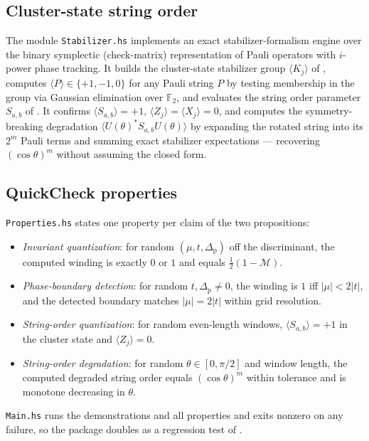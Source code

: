 \documentclass[12pt]{article}
\newcommand{\Maj}{\mathcal{M}}                   %
\theoremstyle{definition}
\theoremstyle{remark}
\begin{document}
\subsection{Cluster-state string order}

The module \texttt{Stabilizer.hs} implements an exact stabilizer-formalism engine over the
binary symplectic (check-matrix) representation of Pauli operators with $i$-power phase
tracking. It builds the cluster-state stabilizer group $\langle K_j\rangle$ of
, computes $\langle P\rangle\in\{+1,-1,0\}$ for any Pauli string $P$ by
testing membership in the group via Gaussian elimination over $\mathbb{F}_2$, and evaluates
the string order parameter $S_{a,b}$ of . It confirms $\langle
S_{a,b}\rangle=+1$, $\langle Z_j\rangle=\langle X_j\rangle=0$, and computes the
symmetry-breaking degradation $\langle U(\theta)^\ast S_{a,b}U(\theta)\rangle$ by expanding
the rotated string into its $2^m$ Pauli terms and summing exact stabilizer expectations ---
recovering $(\cos\theta)^m$ without assuming the closed form.

\subsection{QuickCheck properties}

\texttt{Properties.hs} states one property per claim of the two propositions:
\begin{itemize}
  \item \emph{Invariant quantization}: for random $(\mu,t,\Delta_{\mathrm{p}})$ off the discriminant, the
        computed winding is exactly $0$ or $1$ and equals $\tfrac12(1-\Maj)$.
  \item \emph{Phase-boundary detection}: for random $t,\Delta_{\mathrm{p}}\ne0$, the winding is $1$ iff
        $|\mu|<2|t|$, and the detected boundary matches $|\mu|=2|t|$ within grid resolution.
  \item \emph{String-order quantization}: for random even-length windows, $\langle
        S_{a,b}\rangle=+1$ in the cluster state and $\langle Z_j\rangle=0$.
  \item \emph{String-order degradation}: for random $\theta\in[0,\pi/2]$ and window length,
        the computed degraded string order equals $(\cos\theta)^m$ within tolerance and is
        monotone decreasing in $\theta$.
\end{itemize}
\texttt{Main.hs} runs the demonstrations and all properties and exits nonzero on any failure,
so the package doubles as a regression test of .
\end{document}
